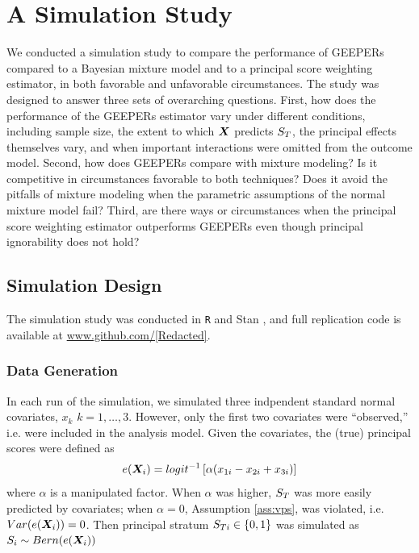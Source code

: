 \documentclass[11pt]{article} %
\begin{document}
\section{A Simulation Study}\label{sec:simulation}

We conducted a simulation study to compare the performance of GEEPERs compared to a Bayesian mixture model and to a principal score weighting estimator, in both favorable and unfavorable circumstances.
The study was designed to answer three sets of overarching questions.
First, how does the performance of the GEEPERs estimator vary under different conditions, including sample size, the extent to which $\bm{X}$ predicts $S_T$, the principal effects themselves vary, and when important interactions were omitted from the outcome model.
Second, how does GEEPERs compare with mixture modeling? Is it competitive in circumstances favorable to both techniques? Does it avoid the pitfalls of mixture modeling when the parametric assumptions of the normal mixture model fail?
Third, are there ways or circumstances when the principal score weighting estimator outperforms GEEPERs even though principal ignorability does not hold?



\subsection{Simulation Design}
The simulation study was conducted in \texttt{R} \citep{rcite} and Stan \citep{rstan}, and full replication code is available at \url{www.github.com/[Redacted]}.
\subsubsection{Data Generation}

In each run of the simulation, we simulated three indpendent standard normal covariates, $x_k$ $k=1,\dots,3$. However, only the first two covariates were ``observed,'' i.e. were included in the analysis model.
Given the covariates, the (true) principal scores were defined as
\begin{equation*}
  e(\bm{X}_i)=logit^{-1}\left[\alpha(x_{1i}-x_{2i}+x_{3i})\right]
\end{equation*}
where $\alpha$ is a manipulated factor.
When $\alpha$ was higher, $S_T$ was more easily predicted by covariates; when $\alpha=0$, Assumption \ref{ass:vps}, was violated, i.e. $Var(e(\bm{X}_i))=0$.
Then principal stratum $S_{Ti}\in \{0,1\}$ was simulated as $S_i\sim Bern(e(\bm{X}_i))$
\end{document}
